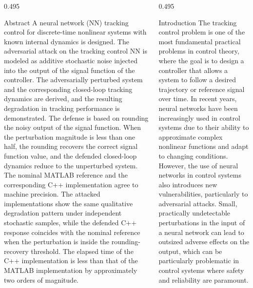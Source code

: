 \documentclass[final]{beamer}
\newlength{\postergap}      \setlength{\postergap}{0.7cm}
\newlength{\rowAh}          \setlength{\rowAh}{13.1cm}
\begin{document}
\begin{frame}[t]
\begin{center}
\begin{minipage}{0.975\textwidth}
			\vspace{\postergap}

			\begin{minipage}[t][\rowAh]{\linewidth}
				\begin{columns}[T,totalwidth=\linewidth]
					\begin{column}{0.495\linewidth}
						\begin{posterpanel}[height=\rowAh]{Abstract}
							A neural network (NN) tracking control for discrete-time nonlinear
							systems with known internal dynamics is designed. The adversarial attack
							on the tracking control NN is modeled as additive stochastic noise
							injected into the output of the signal function of the controller. The
							adversarially perturbed system and the corresponding closed-loop tracking
							dynamics are derived, and the resulting degradation in tracking
							performance is demonstrated. The defense is based on rounding the noisy
							output of the signal function. When the perturbation magnitude is less
							than one half, the rounding recovers the correct signal function value,
							and the defended closed-loop dynamics reduce to the unperturbed system.
							The nominal MATLAB reference and the corresponding C++ implementation
							agree to machine precision. The attacked implementations show the same
							qualitative degradation pattern under independent stochastic samples,
							while the defended C++ response coincides with the nominal reference
							when the perturbation is inside the rounding-recovery threshold. The
							elapsed time of the C++ implementation is less than that of the MATLAB
							implementation by approximately two orders of magnitude.
						\end{posterpanel}
					\end{column}
					\begin{column}{0.495\linewidth}
						\begin{posterpanel}[height=\rowAh]{Introduction}
							The tracking control problem is one of the most fundamental practical
							problems in control theory, where the goal is to design a controller
							that allows a system to follow a desired trajectory or reference signal
							over time. In recent years, neural networks have been increasingly used
							in control systems due to their ability to approximate complex nonlinear
							functions and adapt to changing conditions. However, the use of neural
							networks in control systems also introduces new vulnerabilities,
							particularly to adversarial attacks. Small, practically undetectable
							perturbations in the input of a neural network can lead to outsized
							adverse effects on the output, which can be particularly problematic in
							control systems where safety and reliability are paramount.


\end{posterpanel}
\end{column}
\end{columns}
\end{minipage}
\end{minipage}
\end{center}
\end{frame}
\end{document}

